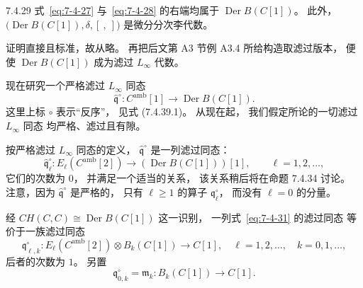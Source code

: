 \begin{lemma}{7.4.29}\label{lem:7-4-29}
式~\eqref{eq:7-4-27}
与~\eqref{eq:7-4-28}
的右端均属于
$\operatorname{Der}B(C[1])$。
此外，
$\bigl(\operatorname{Der}B(C[1]),
\delta,[\ ,\ ]\bigr)$
是微分分次李代数。
\end{lemma}

证明直接且标准，故从略。
再把后文第 A3 节例 A3.4
所给构造取滤过版本，
便使 $\operatorname{Der}B(C[1])$
成为滤过 $L_\infty$ 代数。

现在研究一个严格滤过
$L_\infty$ 同态
\begin{equation}
\widehat{\mathfrak q}^{\circ}:
C^{\mathrm{amb}}[1]
\longrightarrow\operatorname{Der}B(C[1]).
\tag{7.4.30}\label{eq:7-4-30}
\end{equation}
这里上标 $\circ$ 表示“反序”，
见式 (7.4.39.1)。
从现在起，
我们假定所论的一切滤过
$L_\infty$ 同态
均严格、滤过且有隙。

按严格滤过 $L_\infty$ 同态的定义，
$\widehat{\mathfrak q}^{\circ}$
是一列滤过同态：
\begin{equation}
\widehat{\mathfrak q}^{\circ}_\ell:
E_\ell(C^{\mathrm{amb}}[2])
\longrightarrow
(\operatorname{Der}B(C[1]))[1],
\qquad \ell=1,2,\ldots,
\tag{7.4.31}\label{eq:7-4-31}
\end{equation}
它们的次数为 $0$，
并满足一个适当的关系，
该关系稍后将在命题 7.4.34 讨论。
注意，因为
$\widehat{\mathfrak q}^{\circ}$
是严格的，
只有 $\ell\ge1$ 的算子
$\mathfrak q^{\circ}_\ell$，
而没有 $\ell=0$ 的分量。

经
$CH(C,C)\cong\operatorname{Der}B(C[1])$
这一识别，
一列式~\eqref{eq:7-4-31}
的滤过同态
等价于一族滤过同态
\begin{equation}
\mathfrak q^{\circ}_{\ell,k}:
E_\ell(C^{\mathrm{amb}}[2])
\otimes B_k(C[1])
\longrightarrow C[1],
\quad \ell=1,2,\ldots,\quad k=0,1,\ldots,
\tag{7.4.32}\label{eq:7-4-32}
\end{equation}
后者的次数为 $1$。
另置
\begin{equation}
\mathfrak q^{\circ}_{0,k}
=\mathfrak m_k:
B_k(C[1])\longrightarrow C[1].
\tag{7.4.33}\label{eq:7-4-33}
\end{equation}
